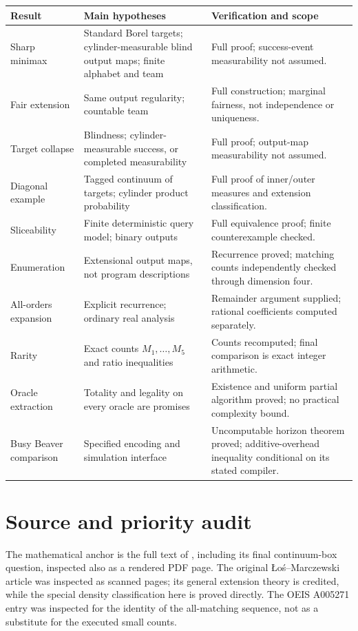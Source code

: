 \documentclass[11pt,letterpaper]{article}
\theoremstyle{definition}
\begin{document}
\begin{longtable}{>{\raggedright\arraybackslash}p{}>{\raggedright\arraybackslash}p{}>{\raggedright\arraybackslash}p{}}
\toprule
Result & Main hypotheses & Verification and scope\\
\midrule
\endhead
Sharp minimax & Standard Borel targets; cylinder-measurable blind output maps; finite alphabet and team & Full proof; success-event measurability not assumed.\\[4pt]
Fair extension & Same output regularity; countable team & Full construction; marginal fairness, not independence or uniqueness.\\[4pt]
Target collapse & Blindness; cylinder-measurable success, or completed measurability & Full proof; output-map measurability not assumed.\\[4pt]
Diagonal example & Tagged continuum of targets; cylinder product probability & Full proof of inner/outer measures and extension classification.\\[4pt]
Sliceability & Finite deterministic query model; binary outputs & Full equivalence proof; finite counterexample checked.\\[4pt]
Enumeration & Extensional output maps, not program descriptions & Recurrence proved; matching counts independently checked through dimension four.\\[4pt]
All-orders expansion & Explicit recurrence; ordinary real analysis & Remainder argument supplied; rational coefficients computed separately.\\[4pt]
Rarity & Exact counts $M_1,\ldots,M_5$ and ratio inequalities & Counts recomputed; final comparison is exact integer arithmetic.\\[4pt]
Oracle extraction & Totality and legality on every oracle are promises & Existence and uniform partial algorithm proved; no practical complexity bound.\\[4pt]
Busy Beaver comparison & Specified encoding and simulation interface & Uncomputable horizon theorem proved; additive-overhead inequality conditional on its stated compiler.\\
\bottomrule
\end{longtable}

\section{Source and priority audit}
\label{mbg:app:audit}
The mathematical anchor is the full text of \cite{GlazerBox}, including its final continuum-box question, inspected also as a rendered PDF page. The original \L o\'s--Marczewski article was inspected as scanned pages; its general extension theory is credited, while the special density classification here is proved directly. The OEIS A005271 entry was inspected for the identity of the all-matching sequence, not as a substitute for the executed small counts.
\end{document}
